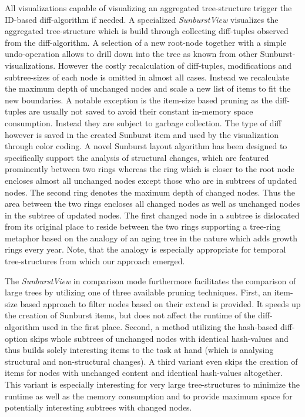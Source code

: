 All visualizations capable of visualizing an aggregated tree-structure trigger the ID-based diff-algorithm if needed. A specialized \emph{SunburstView} visualizes the aggregated tree-structure which is build through collecting diff-tuples observed from the diff-algorithm. A selection of a new root-node together with a simple undo-operation allows to drill down into the tree as known from other Sunburst-visualizations. However the costly recalculation of diff-tuples, modifications and subtree-sizes of each node is omitted in almost all cases. Instead we recalculate the maximum depth of unchanged nodes and scale a new list of items to fit the new boundaries. A notable exception is the item-size based pruning as the diff-tuples are usually not saved to avoid their constant in-memory space consumption. Instead they are subject to garbage collection. The type of diff however is saved in the created Sunburst item and used by the visualization through color coding. A novel Sunburst layout algorithm has been designed to specifically support the analysis of structural changes, which are featured prominently between two rings whereas the ring which is closer to the root node encloses almost all unchanged nodes except those who are in subtrees of updated nodes. The second ring denotes the maximum depth of changed nodes. Thus the area between the two rings encloses all changed nodes as well as unchanged nodes in the subtree of updated nodes. The first changed node in a subtree is dislocated from its original place to reside between the two rings supporting a tree-ring metaphor based on the analogy of an aging tree in the nature which adds growth rings every year. Note, that the analogy is especially appropriate for temporal tree-structures from which our approach emerged. 

The \emph{SunburstView} in comparison mode furthermore facilitates the comparison of large trees by utilizing one of three available pruning techniques. First, an item-size based approach to filter nodes based on their extend is provided. It speeds up the creation of Sunburst items, but does not affect the runtime of the diff-algorithm used in the first place. Second, a method utilizing the hash-based diff-option skips whole subtrees of unchanged nodes with identical hash-values and thus builds solely interesting items to the task at hand (which is analysing structural and non-structural changes). A third variant even skips the creation of items for nodes with unchanged content and identical hash-values altogether. This variant is especially interesting for very large tree-structures to minimize the runtime as well as the memory consumption and to provide maximum space for potentially interesting subtrees with changed nodes.

